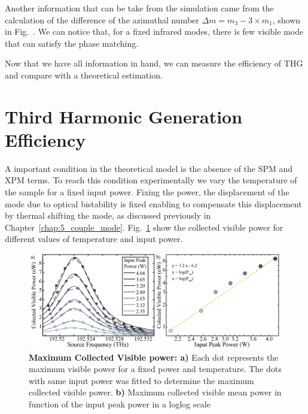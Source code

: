 Another information that can be take from the simulation came from the calculation of the difference of the azimuthal number $\Delta m = m_3 - 3\times m_1$, shown in Fig.~. We can notice that, for a fixed infrared modes, there is few visible mode that can satisfy the phase matching.   

Now that we have all information in hand, we can measure the efficiency of THG and compare with a theoretical estimation. 

\section{Third Harmonic Generation Efficiency}
A important condition in the theoretical model is the absence of the SPM and XPM terms. To reach this condition experimentally we vary the temperature of the sample for a fixed input power. Fixing the power, the displacement of the mode due to optical bistability is fixed enabling to compensate this displacement by thermal shifting the mode, as discussed previously in Chapter~\ref{chap:5_couple_mode}. Fig.~\ref{fig:max_thg} show the collected visible power for different values of temperature and input power.
\begin{figure}[h]
    \centering
    \includegraphics[width = 16cm]{figuras/Dissertation_max_thg.jpg}
    \caption{\textbf{Maximum Collected Visible power: a)} Each dot represents the maximum visible power for a fixed power and temperature. The dots with same input power was fitted to determine the maximum collected visible power. \textbf{b)} Maximum collected visible mean power in function of the input peak power in a loglog scale}
    \label{fig:max_thg}
\end{figure}

